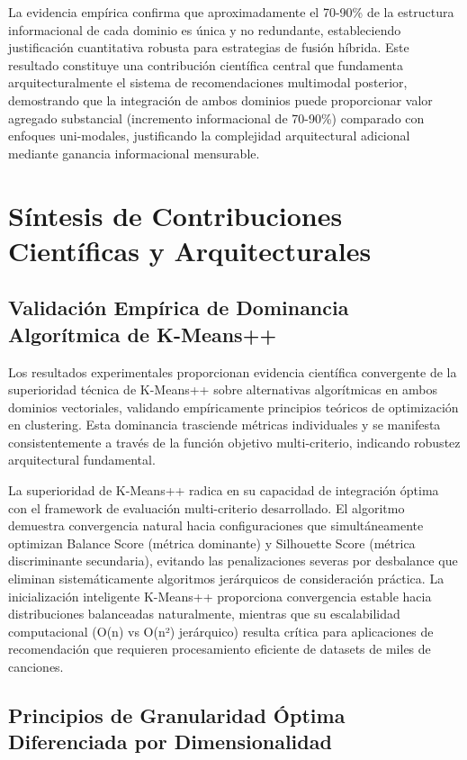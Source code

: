 \documentclass[12pt,a4paper]{report}
\begin{document}
La evidencia empírica confirma que aproximadamente el 70-90\% de la estructura informacional de cada dominio es única y no redundante, estableciendo justificación cuantitativa robusta para estrategias de fusión híbrida. Este resultado constituye una contribución científica central que fundamenta arquitecturalmente el sistema de recomendaciones multimodal posterior, demostrando que la integración de ambos dominios puede proporcionar valor agregado substancial (incremento informacional de 70-90\%) comparado con enfoques uni-modales, justificando la complejidad arquitectural adicional mediante ganancia informacional mensurable.

\section{Síntesis de Contribuciones Científicas y Arquitecturales}

\subsection{Validación Empírica de Dominancia Algorítmica de K-Means++}

Los resultados experimentales proporcionan evidencia científica convergente de la superioridad técnica de K-Means++ sobre alternativas algorítmicas en ambos dominios vectoriales, validando empíricamente principios teóricos de optimización en clustering. Esta dominancia trasciende métricas individuales y se manifesta consistentemente a través de la función objetivo multi-criterio, indicando robustez arquitectural fundamental.

La superioridad de K-Means++ radica en su capacidad de integración óptima con el framework de evaluación multi-criterio desarrollado. El algoritmo demuestra convergencia natural hacia configuraciones que simultáneamente optimizan Balance Score (métrica dominante) y Silhouette Score (métrica discriminante secundaria), evitando las penalizaciones severas por desbalance que eliminan sistemáticamente algoritmos jerárquicos de consideración práctica. La inicialización inteligente K-Means++ proporciona convergencia estable hacia distribuciones balanceadas naturalmente, mientras que su escalabilidad computacional (O(n) vs O(n²) jerárquico) resulta crítica para aplicaciones de recomendación que requieren procesamiento eficiente de datasets de miles de canciones.

\subsection{Principios de Granularidad Óptima Diferenciada por Dimensionalidad}
\end{document}
